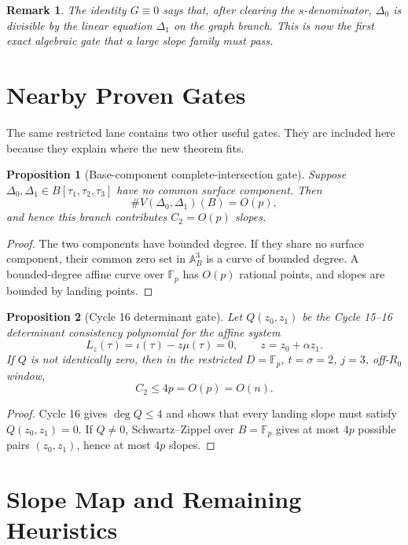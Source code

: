 \documentclass[11pt]{article}
\newtheorem{proposition}{Proposition}
\newtheorem{remark}{Remark}
\newcommand{\F}{\mathbb F}
\newcommand{\Deltaone}{\Delta_1}
\newcommand{\Deltazero}{\Delta_0}
\newcommand{\tauone}{\tau_1}
\newcommand{\tautwo}{\tau_2}
\newcommand{\tauthree}{\tau_3}
\newcommand{\Ctwo}{C_2}
\begin{document}
\begin{remark}
The identity \(G\equiv0\) says that, after clearing the \(s\)-denominator,
\(\Deltazero\) is divisible by the linear equation \(\Deltaone\) on the graph
branch.  This is now the first exact algebraic gate that a large slope family
must pass.
\end{remark}

\section{Nearby Proven Gates}

The same restricted lane contains two other useful gates.  They are included
here because they explain where the new theorem fits.

\begin{proposition}[Base-component complete-intersection gate]
\label{prop:complete-intersection}
Suppose \(\Deltazero,\Deltaone\in B[\tauone,\tautwo,\tauthree]\) have no common
surface component.  Then
\[
  \#V(\Deltazero,\Deltaone)(B)=O(p),
\]
and hence this branch contributes \(\Ctwo=O(p)\) slopes.
\end{proposition}

\begin{proof}
The two components have bounded degree.  If they share no surface component,
their common zero set in \(\mathbb A^3_B\) is a curve of bounded degree.  A
bounded-degree affine curve over \(\F_p\) has \(O(p)\) rational points, and
slopes are bounded by landing points.
\end{proof}

\begin{proposition}[Cycle 16 determinant gate]
\label{prop:det-gate}
Let \(Q(z_0,z_1)\) be the Cycle 15--16 determinant consistency polynomial for
the affine system
\[
  L_z(\tau)=\iota(\tau)-z\mu(\tau)=0,\qquad z=z_0+\alpha z_1.
\]
If \(Q\) is not identically zero, then in the restricted \(D=\F_p\),
\(t=\sigma=2\), \(j=3\), off-\(R_0\) window,
\[
  \Ctwo\le 4p=O(p)=O(n).
\]
\end{proposition}

\begin{proof}
Cycle 16 gives \(\deg Q\le4\) and shows that every landing slope must satisfy
\(Q(z_0,z_1)=0\).  If \(Q\ne0\), Schwartz--Zippel over \(B=\F_p\) gives at
most \(4p\) possible pairs \((z_0,z_1)\), hence at most \(4p\) slopes.
\end{proof}

\section{Slope Map and Remaining Heuristics}
\end{document}
